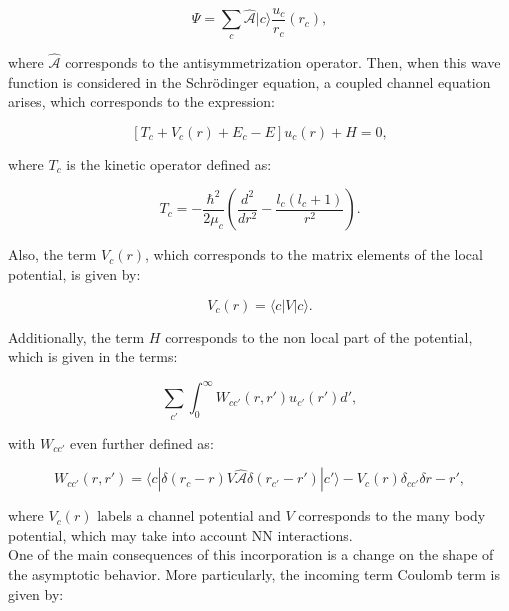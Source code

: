 \documentclass[openany]{book}
\begin{document}
\begin{equation}\label{rmatrix_channels_systemState}
	\Psi = \sum_{c} \hat {\mathcal{A}} |c \rangle \frac{u_c}{r_c}(r_c),
\end{equation}

where $\hat{\mathcal{A}}$ corresponds to the antisymmetrization operator. Then, when this wave function is considered in the Schrödinger equation, a coupled channel equation arises, which corresponds to the expression:

\begin{equation}\label{rmatrix_channels_coupledEquation}
	[T_c + V_c(r) + E_c - E]u_c(r) + H =0,
\end{equation}

where $T_c$ is the kinetic operator defined as:

\begin{equation}\label{rmatrix_channels_kineticOperator}
	T_c = -\frac{\hbar^2}{2\mu_c} \left(\frac{d^2}{dr^2} - \frac{l_c(l_c + 1)}{r^2}\right).
\end{equation}

Also, the term $V_c(r)$, which corresponds to the matrix elements of the local potential, is given by:

\begin{equation}\label{rmatrix_channels_V}
	V_c(r) = \langle c | V | c \rangle. 
\end{equation}

Additionally, the term $H$ corresponds to the non local part of the potential, which is given in the terms:

\begin{equation}\label{rmatrix_channels_nonLocal}
	\sum_{c'}{\int_{0}^{\infty} W_{cc'}(r, r')u_{c'}(r') d'},
\end{equation}

with $W_{cc'}$ even further defined as: 

\begin{equation}\label{rmatrix_channels_nonLocal_W}
	W_{cc'}(r, r') = \langle c | \delta (r_c - r) V \hat{\mathcal{A}} \delta (r_{c'} - r')|  c' \rangle - V_c(r)\delta_{cc'}\delta {r- r'},
\end{equation}

where $V_c(r)$ labels a channel potential and $V$ corresponds to the many body potential, which may take into account NN interactions. \\

One of the main consequences of this incorporation is a change on the shape of the asymptotic behavior. More particularly, the incoming term Coulomb term is given by:
\end{document}
